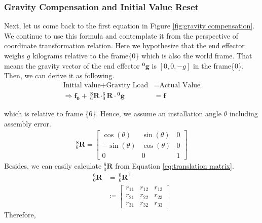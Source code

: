 \subsubsection{Gravity Compensation and Initial Value Reset}
Next, let us come back to the first equation in Figure \ref{fig:gravity compensation}. We continue to use this formula and contemplate it from the perspective of coordinate transformation relation. Here we hypothesize that the end effector weighs $g$ kilograms relative to the frame\{0\} which is also the world frame. That means the gravity vector of the end effector $\boldsymbol{^0\!g}$ is $[0,0,-g]$ in the frame\{0\}. Then, we can derive it as following.
\begin{equation}
\begin{split}
\text{Initial value}	+ \text{Gravity Load} 		&= \text{Actual Value} \\
\Rightarrow
\boldsymbol{f_0} +\  ^\mathrm{S}_6\mathbf{R} \cdot ^6_0\!\mathbf{R} \cdot \boldsymbol{^0\!g} &= \boldsymbol{f}
\end{split}
\end{equation}
\par
which is relative to frame \{6\}.
Hence, we assume an installation angle $\theta$ including assembly error.
\begin{equation}
\begin{split}
 ^\mathrm{S}_6\mathbf{R}
=
\begin{bmatrix}
\cos(\theta)	&\sin(\theta)	&0 \\
-\sin(\theta)	&\cos(\theta)	&0 \\
0				&0				&1
\end{bmatrix}
\end{split}
\end{equation}
Besides, we can easily calculate $^6_0\mathbf{R}$ from Equation \ref{eq:translation matrix}.
\begin{equation}
\begin{split}
^6_0\mathbf{R} 	&=\ ^0_6\mathbf{R}^\top\\
				&\coloneqq
\begin{bmatrix}
r_{11}		&r_{12}		&r_{13} \\
r_{21}		&r_{22}		&r_{23} \\
r_{31}		&r_{32}		&r_{33}
\end{bmatrix}
\end{split}
\end{equation}
Therefore,
